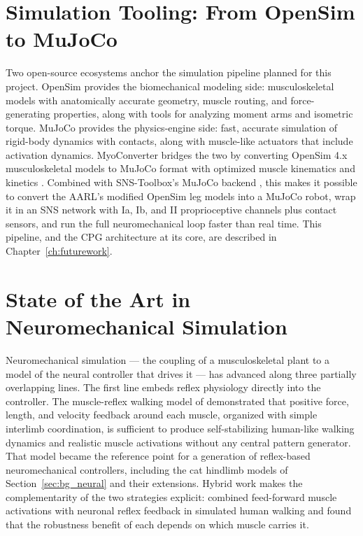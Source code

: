 \section{Simulation Tooling: From OpenSim to MuJoCo}\label{sec:bg_tools}

Two open-source ecosystems anchor the simulation pipeline planned for this project. OpenSim \citep{delp_opensim_2007, seth_opensim_2018} provides the biomechanical modeling side: musculoskeletal models with anatomically accurate geometry, muscle routing, and force-generating properties, along with tools for analyzing moment arms and isometric torque. MuJoCo \citep{todorov_mujoco_2012} provides the physics-engine side: fast, accurate simulation of rigid-body dynamics with contacts, along with muscle-like actuators that include activation dynamics. MyoConverter bridges the two by converting OpenSim 4.x musculoskeletal models to MuJoCo format with optimized muscle kinematics and kinetics \citep{caggiano_myosuite_2022, wang_myosim_2022}. Combined with SNS-Toolbox's MuJoCo backend \citep{nourse_sns_2023}, this makes it possible to convert the AARL's modified OpenSim leg models into a MuJoCo robot, wrap it in an SNS network with Ia, Ib, and II proprioceptive channels plus contact sensors, and run the full neuromechanical loop faster than real time. This pipeline, and the CPG architecture at its core, are described in Chapter~\ref{ch:futurework}.

\section{State of the Art in Neuromechanical Simulation}\label{sec:bg_sota}

Neuromechanical simulation --- the coupling of a musculoskeletal plant to a model of the neural controller that drives it --- has advanced along three partially overlapping lines. The first line embeds reflex physiology directly into the controller. The muscle-reflex walking model of \citet{geyer_musclereflex_2010} demonstrated that positive force, length, and velocity feedback around each muscle, organized with simple interlimb coordination, is sufficient to produce self-stabilizing human-like walking dynamics and realistic muscle activations without any central pattern generator. That model became the reference point for a generation of reflex-based neuromechanical controllers, including the cat hindlimb models of Section~\ref{sec:bg_neural} \citep{markin_afferent_2010, shevtsova_modeling_2016} and their extensions. Hybrid work makes the complementarity of the two strategies explicit: \citet{haeufle_benefit_2018} combined feed-forward muscle activations with neuronal reflex feedback in simulated human walking and found that the robustness benefit of each depends on which muscle carries it.

